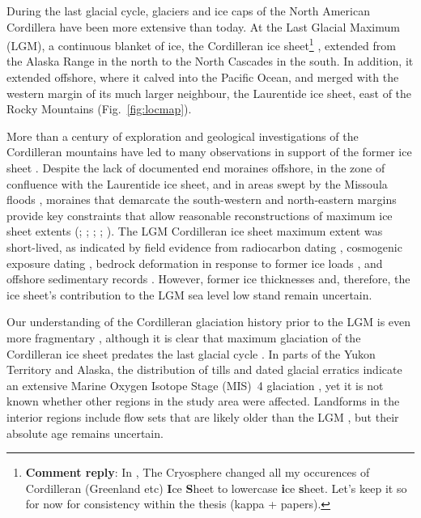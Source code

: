\documentclass[tc, manuscript]{copernicus}
\newcommand{\renote}[1]{\footnote{\textbf{Comment reply}: #1}}
\begin{document}
\introduction
\label{sec:intro}

During the last glacial cycle, glaciers and ice caps of the North American
Cordillera have been more extensive than today. At the Last Glacial
Maximum (LGM), a continuous blanket of ice, the Cordilleran ice sheet\renote{
    In \citep{Seguinot.etal.2014}, The Cryosphere changed all my occurences of
    Cordilleran (Greenland etc) \textbf{I}ce \textbf{S}heet to lowercase
    \textbf{i}ce \textbf{s}heet. Let's keep it so for now for consistency
    within the thesis (kappa + papers).}
\citep{Dawson.1888}, extended from the Alaska Range in the north to the
North Cascades in the south. In addition, it extended offshore, where it calved
into the Pacific Ocean, and merged with the western margin of its much larger
neighbour, the Laurentide ice sheet, east of the Rocky Mountains
(Fig.~\ref{fig:locmap}).

More than a century of exploration and geological investigations of the
Cordilleran mountains have led to many observations in support of the former
ice sheet
    \citep{Jackson.Clague.1991}.
Despite the lack of documented end moraines offshore, in the zone of confluence
with the Laurentide ice sheet, and in areas swept by the Missoula floods
    \citep{Carrara.etal.1996},
moraines that demarcate the south-western and north-eastern margins provide key
constraints that allow reasonable reconstructions of maximum ice sheet extents
    (\citealp{Prest.etal.1968}; \citealp[Fig. 1.12]{Clague.1989};
     \citealp{Duk-Rodkin.1999};
     \citealp{Booth.etal.2003}; \citealp{Dyke.2004}).
The LGM Cordilleran ice sheet maximum extent was short-lived, as indicated by
field evidence from radiocarbon dating
    \citep{Clague.etal.1980, Clague.1985, Clague.1986, Porter.Swanson.1998,
           Menounos.etal.2008},
cosmogenic exposure dating
    \citep{Stroeven.etal.2010, Stroeven.etal.2014, Margold.etal.inpress},
bedrock deformation in response to former ice loads
    \citep{Clague.James.2002, Clague.etal.2005},
and offshore sedimentary records
    \citep{Cosma.etal.2008, Davies.etal.2011}.
However, former ice thicknesses and, therefore, the ice sheet's contribution to
the LGM sea level low stand
    \citep{Carlson.Clark.2012, Clark.Mix.2002}
remain uncertain.

Our understanding of the Cordilleran glaciation history prior to the LGM is
even more fragmentary
    \citep{Barendregt.Irving.1998, Kleman.etal.2010, Rutter.etal.2012},
although it is clear that maximum glaciation of the Cordilleran ice sheet
predates the last glacial cycle
    \citep{Hidy.etal.2013}.
In parts of the Yukon Territory and Alaska, the distribution of tills
    \citep{Turner.etal.2013}
and dated glacial erratics indicate an extensive Marine Oxygen Isotope Stage
(MIS)~4 glaciation
    \citep{Ward.etal.2007, Ward.etal.2008, Briner.Kaufman.2008,
           Stroeven.etal.2010, Stroeven.etal.2014},
yet it is not known whether other regions in the study area were affected.
Landforms in the interior regions include flow sets that are likely
older than the LGM
    \citep[Fig.~2]{Kleman.etal.2010},
but their absolute age remains uncertain.
\end{document}
